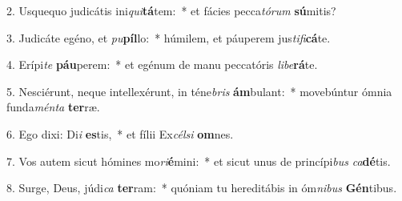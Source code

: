2. Usquequo judicátis ini\textit{qui}\textbf{tá}tem:~*  et fácies pecca\textit{tó}\textit{rum} \textbf{sú}mitis?\

3. Judicáte egéno, et \textit{pu}\textbf{píl}lo:~*  húmilem, et páuperem jus\textit{ti}\textit{fi}\textbf{cá}te.\

4. Erípi\textit{te} \textbf{páu}perem:~*  et egénum de manu peccatóris \textit{li}\textit{be}\textbf{rá}te.\

5. Nesciérunt, neque intellexérunt, in téne\textit{bris} \textbf{ám}bulant:~*  movebúntur ómnia funda\textit{mén}\textit{ta} \textbf{ter}ræ.\

6. Ego dixi: Di\textit{i} \textbf{es}tis,~*  et fílii Ex\textit{cél}\textit{si} \textbf{om}nes.\

7. Vos autem sicut hómines mo\textit{ri}\textbf{é}mini:~*  et sicut unus de princípi\textit{bus} \textit{ca}\textbf{dé}tis.\

8. Surge, Deus, júdi\textit{ca} \textbf{ter}ram:~*  quóniam tu hereditábis in óm\textit{ni}\textit{bus} \textbf{Gén}tibus.\

